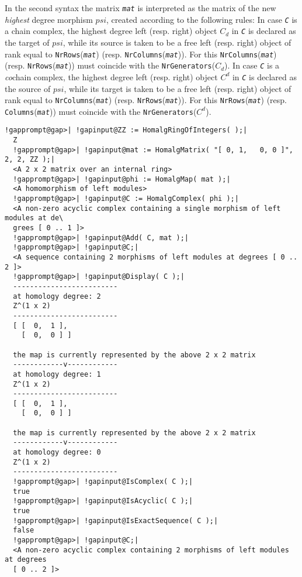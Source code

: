 \documentclass[a4paper,11pt]{report}
\begin{document}
{{{ In the second syntax the matrix \mbox{\texttt{\mdseries\slshape mat}} is interpreted as the matrix of the new \emph{highest} degree morphism $psi$, created according to the following rules: In case \mbox{\texttt{\mdseries\slshape C}} is a chain complex, the highest degree left (resp. right) object $C_d$ in \mbox{\texttt{\mdseries\slshape C}} is declared as the target of $psi$, while its source is taken to be a free left (resp. right) object of rank
equal to \texttt{NrRows}(\mbox{\texttt{\mdseries\slshape mat}}) (resp. \texttt{NrColumns}(\mbox{\texttt{\mdseries\slshape mat}})). For this \texttt{NrColumns}(\mbox{\texttt{\mdseries\slshape mat}}) (resp. \texttt{NrRows}(\mbox{\texttt{\mdseries\slshape mat}})) must coincide with the \texttt{NrGenerators}($C_d$). In case \mbox{\texttt{\mdseries\slshape C}} is a \emph{co}chain complex, the highest degree left (resp. right) object $C^d$ in \mbox{\texttt{\mdseries\slshape C}} is declared as the source of $psi$, while its target is taken to be a free left (resp. right) object of rank
equal to \texttt{NrColumns}(\mbox{\texttt{\mdseries\slshape mat}}) (resp. \texttt{NrRows}(\mbox{\texttt{\mdseries\slshape mat}})). For this \texttt{NrRows}(\mbox{\texttt{\mdseries\slshape mat}}) (resp. \texttt{Columns}(\mbox{\texttt{\mdseries\slshape mat}})) must coincide with the \texttt{NrGenerators}($C^d$). 
\begin{Verbatim}[commandchars=!@|,fontsize=\small,frame=single,label=Example]
  !gapprompt@gap>| !gapinput@ZZ := HomalgRingOfIntegers( );|
  Z
  !gapprompt@gap>| !gapinput@mat := HomalgMatrix( "[ 0, 1,   0, 0 ]", 2, 2, ZZ );|
  <A 2 x 2 matrix over an internal ring>
  !gapprompt@gap>| !gapinput@phi := HomalgMap( mat );|
  <A homomorphism of left modules>
  !gapprompt@gap>| !gapinput@C := HomalgComplex( phi );|
  <A non-zero acyclic complex containing a single morphism of left modules at de\
  grees [ 0 .. 1 ]>
  !gapprompt@gap>| !gapinput@Add( C, mat );|
  !gapprompt@gap>| !gapinput@C;|
  <A sequence containing 2 morphisms of left modules at degrees [ 0 .. 2 ]>
  !gapprompt@gap>| !gapinput@Display( C );|
  -------------------------
  at homology degree: 2
  Z^(1 x 2)
  -------------------------
  [ [  0,  1 ],
    [  0,  0 ] ]
  
  the map is currently represented by the above 2 x 2 matrix
  ------------v------------
  at homology degree: 1
  Z^(1 x 2)
  -------------------------
  [ [  0,  1 ],
    [  0,  0 ] ]
  
  the map is currently represented by the above 2 x 2 matrix
  ------------v------------
  at homology degree: 0
  Z^(1 x 2)
  -------------------------
  !gapprompt@gap>| !gapinput@IsComplex( C );|
  true
  !gapprompt@gap>| !gapinput@IsAcyclic( C );|
  true
  !gapprompt@gap>| !gapinput@IsExactSequence( C );|
  false
  !gapprompt@gap>| !gapinput@C;|
  <A non-zero acyclic complex containing 2 morphisms of left modules at degrees
  [ 0 .. 2 ]>
\end{Verbatim}
 }

}}
\end{document}

